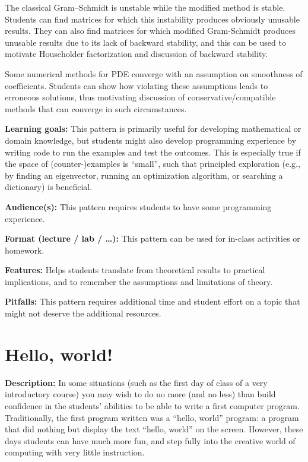 \documentclass[]{book}
\begin{document}
The classical Gram--Schmidt is unstable while the modified method is
stable. Students can find matrices for which this instability produces
obviously unusable results. They can also find matrices for which
modified Gram-Schmidt produces unusable results due to its lack of
backward stability, and this can be used to motivate Householder
factorization and discussion of backward stability.

Some numerical methods for PDE converge with an assumption on smoothness
of coefficients. Students can show how violating these assumptions leads
to erroneous solutions, thus motivating discussion of
conservative/compatible methods that can converge in such circumstances.

\textbf{Learning goals:} This pattern is primarily useful for developing
mathematical or domain knowledge, but students might also develop
programming experience by writing code to run the examples and test the
outcomes. This is especially true if the space of (counter-)examples is
``small'', such that principled exploration (e.g., by finding an
eigenvector, running an optimization algorithm, or searching a
dictionary) is beneficial.

\textbf{Audience(s):} This pattern requires students to have some
programming experience.

\textbf{Format (lecture / lab / \ldots{}):} This pattern can be used for
in-class activities or homework.

\textbf{Features:} Helps students translate from theoretical results to
practical implications, and to remember the assumptions and limitations
of theory.

\textbf{Pitfalls:} This pattern requires additional time and student
effort on a topic that might not deserve the additional resources.

\section{Hello, world!}\label{hello-world}

\textbf{Description:} In some situations (such as the first day of class
of a very introductory course) you may wish to do no more (and no less)
than build confidence in the students' abilities to be able to write a
first computer program. Traditionally, the first program written was a
``hello, world'' program: a program that did nothing but display the
text ``hello, world'' on the screen. However, these days students can
have much more fun, and step fully into the creative world of computing
with very little instruction.
\end{document}
